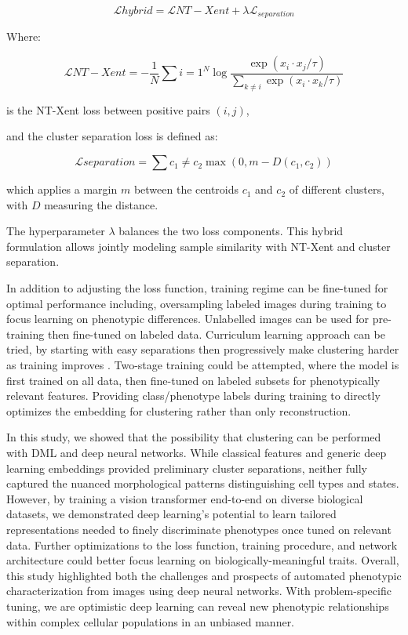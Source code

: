 \documentclass[12pt,a4paper]{article}
\begin{document}
\begin{equation}
\mathcal{L}{hybrid} = \mathcal{L}{NT-Xent} + \lambda \mathcal{L}_{separation}
\end{equation}

Where:

\begin{equation}
\mathcal{L}{NT-Xent} = - \frac{1}{N} \sum{i=1}^N \log \frac{\exp(x_i \cdot x_j / \tau)}{\sum_{k \neq i} \exp(x_i \cdot x_k / \tau)}
\end{equation}

is the NT-Xent loss between positive pairs $(i,j)$,

and the cluster separation loss is defined as:

\begin{equation}
\mathcal{L}{separation} = \sum{c_1 \neq c_2} \max(0, m - D(c_1, c_2))
\end{equation}

which applies a margin $m$ between the centroids $c_1$ and $c_2$ of different clusters, with $D$ measuring the distance.

The hyperparameter $\lambda$ balances the two loss components. This hybrid formulation allows jointly modeling sample similarity with NT-Xent and cluster separation.

In addition to adjusting the loss function, training regime can be fine-tuned for optimal performance including, oversampling labeled images during training to focus learning on phenotypic differences. Unlabelled images can be used for pre-training then fine-tuned on labeled data. Curriculum learning approach can be tried, by starting with easy separations then progressively make clustering harder as training improves \cite{bengio2009curriculum}. Two-stage training could be attempted, where the model is first trained on all data, then fine-tuned on labeled subsets for phenotypically relevant features. Providing class/phenotype labels during training to directly optimizes the embedding for clustering rather than only reconstruction.

In this study, we showed that the possibility that clustering can be performed with DML and deep neural networks. While classical features and generic deep learning embeddings provided preliminary cluster separations, neither fully captured the nuanced morphological patterns distinguishing cell types and states. However, by training a vision transformer end-to-end on diverse biological datasets, we demonstrated deep learning's potential to learn tailored representations needed to finely discriminate phenotypes once tuned on relevant data. Further optimizations to the loss function, training procedure, and network architecture could better focus learning on biologically-meaningful traits. Overall, this study highlighted both the challenges and prospects of automated phenotypic characterization from images using deep neural networks. With problem-specific tuning, we are optimistic deep learning can reveal new phenotypic relationships within complex cellular populations in an unbiased manner.
\end{document}
